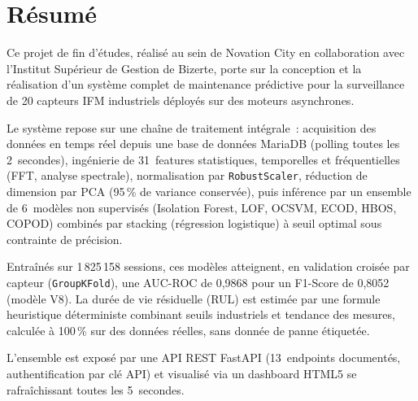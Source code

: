 \documentclass[12pt,a4paper]{report}
\begin{document}

\clearpage
\chapter*{Résumé}
\thispagestyle{plain}

Ce projet de fin d'études, réalisé au sein de Novation City en collaboration avec
l'Institut Supérieur de Gestion de Bizerte, porte sur la conception et la réalisation
d'un système complet de maintenance prédictive pour la surveillance de 20 capteurs
IFM industriels déployés sur des moteurs asynchrones.

Le système repose sur une chaîne de traitement intégrale~: acquisition des données en
temps réel depuis une base de données MariaDB (polling toutes les 2~secondes),
ingénierie de 31~features statistiques, temporelles et fréquentielles (FFT, analyse
spectrale), normalisation par \texttt{RobustScaler}, réduction de dimension par PCA
(95\,\% de variance conservée), puis inférence par un ensemble de 6~modèles non
supervisés (Isolation Forest, LOF, OCSVM, ECOD, HBOS, COPOD) combinés par stacking
(régression logistique) à seuil optimal sous contrainte de précision.

Entraînés sur 1\,825\,158 sessions, ces modèles atteignent, en validation croisée par
capteur (\texttt{GroupKFold}), une AUC-ROC de 0,9868 pour un F1-Score de 0,8052
(modèle V8). La durée de vie résiduelle (RUL) est estimée par une formule heuristique
déterministe combinant seuils industriels et tendance des mesures, calculée à 100\,\%
sur des données réelles, sans donnée de panne étiquetée.

L'ensemble est exposé par une API REST FastAPI (13~endpoints documentés,
authentification par clé API) et visualisé via un dashboard HTML5 se rafraîchissant
toutes les 5~secondes.
\end{document}
